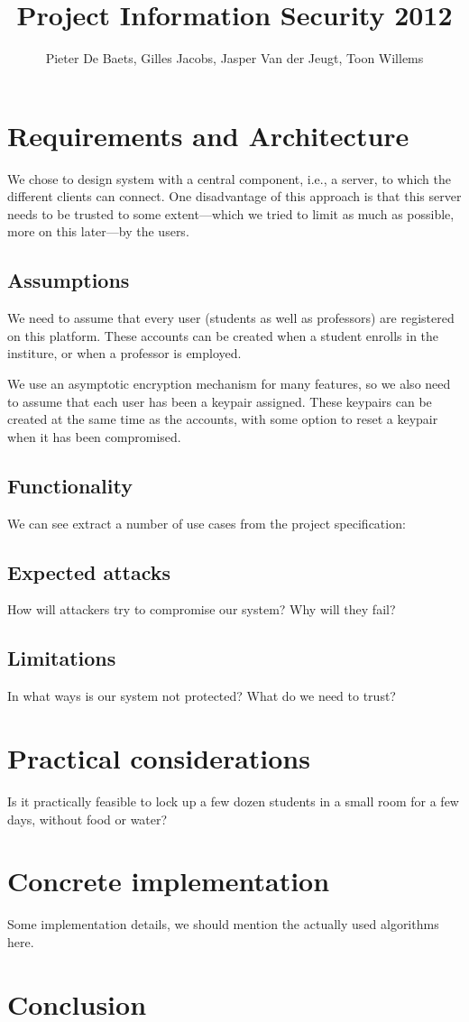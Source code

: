 \documentclass{article}
\title{Project Information Security 2012}
\author{Pieter De Baets, Gilles Jacobs, Jasper Van der Jeugt, Toon Willems}
\begin{document}
\maketitle
\tableofcontents

\newpage

\section{Requirements and Architecture}

We chose to design system with a central component, i.e., a server, to which the
different clients can connect. One disadvantage of this approach is that this
server needs to be trusted to some extent---which we tried to limit as much as
possible, more on this later---by the users.

\subsection{Assumptions}

We need to assume that every user (students as well as professors) are
registered on this platform. These accounts can be created when a student
enrolls in the institure, or when a professor is employed.

We use an asymptotic encryption mechanism for many features, so we also need to
assume that each user has been a keypair assigned. These keypairs can be created
at the same time as the accounts, with some option to reset a keypair when it
has been compromised.

\subsection{Functionality}

We can see extract a number of use cases from the project specification:

\subsection{Expected attacks}

How will attackers try to compromise our system? Why will they fail?

\subsection{Limitations}

In what ways is our system not protected? What do we need to trust?

\section{Practical considerations}

Is it practically feasible to lock up a few dozen students in a small room for a
few days, without food or water?

\section{Concrete implementation}

Some implementation details, we should mention the actually used algorithms
here.

\section{Conclusion}
\end{document}
